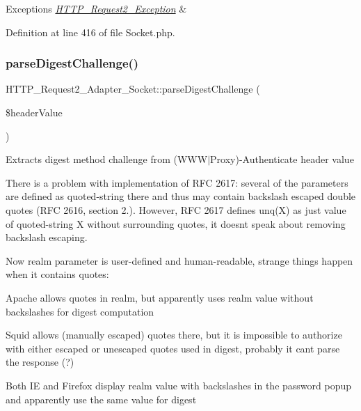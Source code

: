 \begin{DoxyExceptions}{Exceptions}
{\em \hyperlink{classHTTP__Request2__Exception}{H\+T\+T\+P\+\_\+\+Request2\+\_\+\+Exception}} & \\
\hline
\end{DoxyExceptions}


Definition at line 416 of file Socket.\+php.

\mbox{\label{classHTTP__Request2__Adapter__Socket_a271d3c7e7ce64e2acc6f560187c8a7cb}} 
\subsubsection{\texorpdfstring{parse\+Digest\+Challenge()}{parseDigestChallenge()}}
{\footnotesize\ttfamily H\+T\+T\+P\+\_\+\+Request2\+\_\+\+Adapter\+\_\+\+Socket\+::parse\+Digest\+Challenge (\begin{DoxyParamCaption}\item[{}]{\$header\+Value }\end{DoxyParamCaption})\hspace{0.3cm}{\ttfamily [protected]}}

Extracts digest method challenge from (W\+W\+W$\vert$\+Proxy)-\/\+Authenticate header value

There is a problem with implementation of R\+FC 2617\+: several of the parameters are defined as quoted-\/string there and thus may contain backslash escaped double quotes (R\+FC 2616, section 2.). However, R\+FC 2617 defines unq(\+X) as just value of quoted-\/string X without surrounding quotes, it doesn\textquotesingle{}t speak about removing backslash escaping.

Now realm parameter is user-\/defined and human-\/readable, strange things happen when it contains quotes\+:
\begin{DoxyItemize}
\item Apache allows quotes in realm, but apparently uses realm value without backslashes for digest computation
\item Squid allows (manually escaped) quotes there, but it is impossible to authorize with either escaped or unescaped quotes used in digest, probably it can\textquotesingle{}t parse the response (?)
\item Both IE and Firefox display realm value with backslashes in the password popup and apparently use the same value for digest
\end{DoxyItemize}

